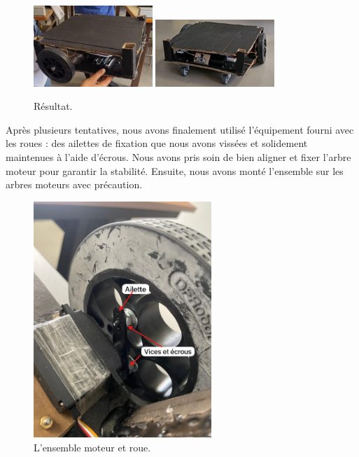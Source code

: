 \documentclass[a4paper,12pt]{report}  %
\begin{document}
\begin{figure}[H]
	\centering
	\includegraphics[width=0.4\textwidth]{./attachments/proto-photo-1.png}
	\includegraphics[width=0.4\textwidth]{./attachments/proto-photo-2.png}
	\caption{Résultat.}
\end{figure}

Après plusieurs tentatives, nous avons finalement utilisé l’équipement fourni avec les roues : des ailettes de fixation que nous avons vissées et solidement maintenues à l’aide d’écrous. Nous avons pris soin de bien aligner et fixer l’arbre moteur pour garantir la stabilité. Ensuite, nous avons monté l’ensemble sur les arbres moteurs avec précaution.

\begin{figure}[H]
	\centering
	\includegraphics[width=0.6\textwidth]{./attachments/servomoteur-roues_ensemble.png}
	\caption{L’ensemble moteur et roue.}
\end{figure}
\end{document}
